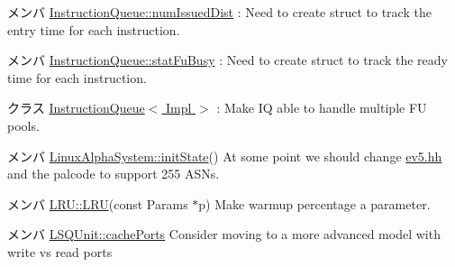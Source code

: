 \label{todo__todo000033}
\hypertarget{todo__todo000033}{}
 
\begin{DoxyDescription}
\item[メンバ \hyperlink{classInstructionQueue_a90810f5beb7dff46f4b45f96620474b6}{InstructionQueue::numIssuedDist} ]: Need to create struct to track the entry time for each instruction. 
\end{DoxyDescription}

\label{todo__todo000034}
\hypertarget{todo__todo000034}{}
 
\begin{DoxyDescription}
\item[メンバ \hyperlink{classInstructionQueue_a92266bfdbc9a6de5005fc3f1654e0b3e}{InstructionQueue::statFuBusy} ]: Need to create struct to track the ready time for each instruction. 
\end{DoxyDescription}

\label{todo__todo000030}
\hypertarget{todo__todo000030}{}
 
\begin{DoxyDescription}
\item[クラス \hyperlink{classInstructionQueue}{InstructionQueue$<$ Impl $>$} ]: Make IQ able to handle multiple FU pools. 
\end{DoxyDescription}

\label{todo__todo000001}
\hypertarget{todo__todo000001}{}
 
\begin{DoxyDescription}
\item[メンバ \hyperlink{classLinuxAlphaSystem_a3c34ea9b29f410748d4435a667484924}{LinuxAlphaSystem::initState}() ]At some point we should change \hyperlink{ev5_8hh}{ev5.hh} and the palcode to support 255 ASNs. 
\end{DoxyDescription}

\label{todo__todo000081}
\hypertarget{todo__todo000081}{}
 
\begin{DoxyDescription}
\item[メンバ \hyperlink{classLRU_ad9acf3c29ee59e97dd4b0b73d560f382}{LRU::LRU}(const Params $\ast$p) ]Make warmup percentage a parameter. 
\end{DoxyDescription}

\label{todo__todo000038}
\hypertarget{todo__todo000038}{}
 
\begin{DoxyDescription}
\item[メンバ \hyperlink{classLSQUnit_ab2e23636971c40e7ed945026b2a184e1}{LSQUnit::cachePorts} ]Consider moving to a more advanced model with write vs read ports 
\end{DoxyDescription}


